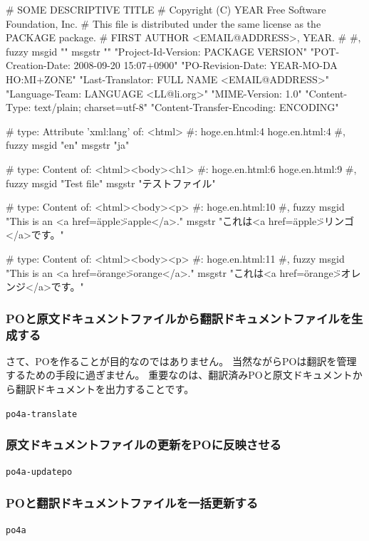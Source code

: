 \documentclass[mingoth,a4paper]{jsarticle}
\begin{document}
\begin{commandline}
# SOME DESCRIPTIVE TITLE
# Copyright (C) YEAR Free Software Foundation, Inc.
# This file is distributed under the same license as the PACKAGE package.
# FIRST AUTHOR <EMAIL@ADDRESS>, YEAR.
#
#, fuzzy
msgid ""
msgstr ""
"Project-Id-Version: PACKAGE VERSION\n"
"POT-Creation-Date: 2008-09-20 15:07+0900\n"
"PO-Revision-Date: YEAR-MO-DA HO:MI+ZONE\n"
"Last-Translator: FULL NAME <EMAIL@ADDRESS>\n"
"Language-Team: LANGUAGE <LL@li.org>\n"
"MIME-Version: 1.0\n"
"Content-Type: text/plain; charset=utf-8\n"
"Content-Transfer-Encoding: ENCODING"

# type: Attribute 'xml:lang' of: <html>
#: hoge.en.html:4 hoge.en.html:4
#, fuzzy
msgid "en"
msgstr "ja"

# type: Content of: <html><body><h1>
#: hoge.en.html:6 hoge.en.html:9
#, fuzzy
msgid "Test file"
msgstr "テストファイル"

# type: Content of: <html><body><p>
#: hoge.en.html:10
#, fuzzy
msgid "This is an <a href=\"apple\">apple</a>."
msgstr "これは<a href=\"apple\">リンゴ</a>です。"

# type: Content of: <html><body><p>
#: hoge.en.html:11
#, fuzzy
msgid "This is an <a href=\"orange\">orange</a>."
msgstr "これは<a href=\"orange\">オレンジ</a>です。"
\end{commandline}

\subsubsection{POと原文ドキュメントファイルから翻訳ドキュメントファイルを生成する}

さて、POを作ることが目的なのではありません。
当然ながらPOは翻訳を管理するための手段に過ぎません。
重要なのは、翻訳済みPOと原文ドキュメントから翻訳ドキュメントを出力することです。

\texttt{po4a-translate}

\subsubsection{原文ドキュメントファイルの更新をPOに反映させる}

\texttt{po4a-updatepo}

\subsubsection{POと翻訳ドキュメントファイルを一括更新する}

\texttt{po4a}
\end{document}
